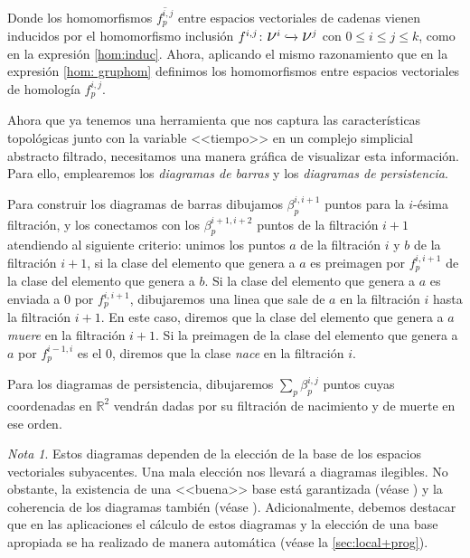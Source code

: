 \documentclass[12pt, a4paper, twoside]{book}
\numberwithin{equation}{section}
\theoremstyle{definition}
\theoremstyle{remark}
\newtheorem*{remark}{Nota}
\theoremstyle{plain}
\begin{document}
	Donde los homomorfismos $\overline{f_{p}^{i,j}}$ entre espacios 
	vectoriales de 
	cadenas vienen inducidos por el homomorfismo inclusión $f^{i,j}\colon 
	\text{{\Large $\nu$}$^{i}$} \xhookrightarrow{} 
	\text{{\Large $\nu$}$^{j}$}$ con $0\leq i \leq j \leq k$, como en la 
	expresión
	\ref{hom:induc}. Ahora, aplicando el mismo razonamiento que en la 
	expresión 
	\ref{hom: gruphom} definimos los homomorfismos entre espacios 
	vectoriales de 
	homología $f^{i,j}_{p}$.

	Ahora que ya tenemos una herramienta que nos captura las 
	características topológicas junto con la variable <<tiempo>> en un 
	complejo simplicial abstracto filtrado, necesitamos una manera gráfica 
	de visualizar esta información. Para ello, emplearemos los  
	\emph{diagramas de barras} y los \emph{diagramas de persistencia}.
	
	Para construir los diagramas de barras dibujamos $\beta_{p}^{i,i+1}$ 
	puntos para la $i$-ésima filtración, y los conectamos con los 
	$\beta_{p}^{i+1,i+2}$ puntos de la filtración $i+1$ atendiendo al 
	siguiente criterio: unimos los puntos $a$ de la filtración $i$ y $b$ de
	la filtración $i+1$, si la clase del elemento que genera a $a$ es 
	preimagen por $f_{p}^{i,i+1}$ de la clase del elemento que genera a 
	$b$. Si la clase del elemento que genera a $a$ es enviada a 0 por 
	$f_{p}^{i,i+1}$, dibujaremos una linea que sale de $a$ en la filtración
	$i$ hasta la filtración $i+1$. En este caso, diremos que la clase del 
	elemento que genera a $a$ \emph{muere} en la filtración $i+1$. Si la 
	preimagen de la clase del elemento que genera a $a$ por 
	$f_{p}^{i-1,i}$ es el 0, diremos que la clase \emph{nace} en la 
	filtración $i$.

	Para los diagramas de persistencia, dibujaremos $\sum_{p}
	\beta_{p}^{i,j}$ puntos cuyas coordenadas en $\mathbb{R}^{2}$ vendrán 
	dadas por su filtración de nacimiento y de muerte en ese orden. 

	\begin{remark}
		Estos diagramas dependen de la elección de la base de los 
		espacios vectoriales subyacentes. Una mala elección nos 
		llevará a diagramas ilegibles. No obstante, la existencia de 
		una <<buena>> base está garantizada (véase 
		\cite{BaseDiagExt-Carlsson}) y la 
		coherencia de los diagramas también (véase 
		\cite{BaseDiag-Cavanna}). Adicionalmente, debemos destacar que
		en las aplicaciones el cálculo de estos diagramas y la 
		elección de una base apropiada se ha 
		realizado de manera automática (véase la
		\autoref{sec:local+prog}). 
	\end{remark}
\end{document}
